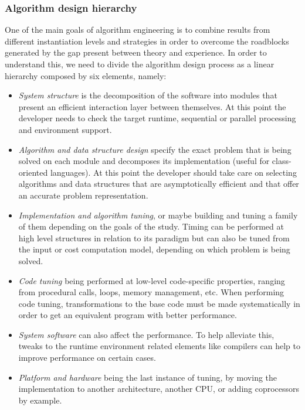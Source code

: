 \subsubsection{Algorithm design hierarchy}
One of the main goals of algorithm engineering is to combine results from different instantiation levels and strategies in order to overcome the roadblocks generated by the gap present between theory and experience. In order to understand this, we need to divide the algorithm design process as a linear hierarchy composed by six elements, namely:

\begin{itemize}
    \item \textit{System structure} is the decomposition of the software into modules that present an efficient interaction layer between themselves. At this point the developer needs to check the target runtime, sequential or parallel processing and environment support.
    \item \textit{Algorithm and data structure design} specify the exact problem that is being solved on each module and decomposes its implementation (useful for class-oriented languages). At this point the developer should take care on selecting algorithms and data structures that are asymptotically efficient and that offer an accurate problem representation.
    \item \textit{Implementation and algorithm tuning}, or maybe building and tuning a family of them depending on the goals of the study. Timing can be performed  at high level structures in relation to its paradigm but can also be tuned from the input or cost computation model, depending on which problem is being solved.
    \item \textit{Code tuning} being performed at low-level code-specific properties, ranging from procedural calls, loops, memory management, etc. When performing code tuning, transformations to the base code must be made systematically in order to get an equivalent program with better performance.
    \item \textit{System software} can also affect the performance. To help alleviate this, tweaks to the runtime environment related elements like compilers can help to improve performance on certain cases.
    \item \textit{Platform and hardware} being the last instance of tuning, by moving the implementation to another architecture, another CPU, or adding coprocessors by example.
\end{itemize}


